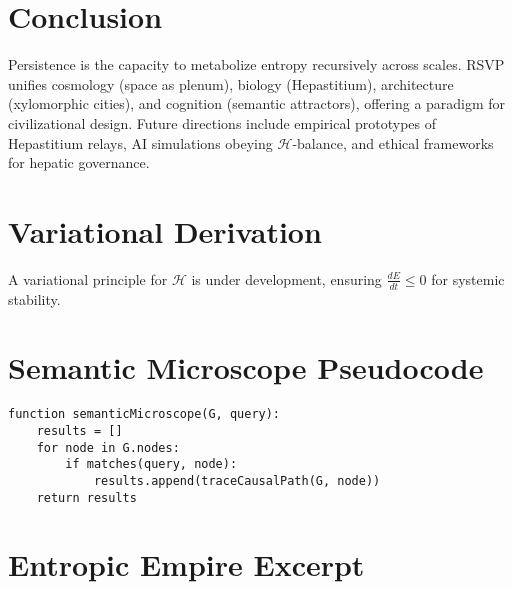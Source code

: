 \documentclass[12pt]{article}
\begin{document}
\section{Conclusion}
\label{sec:conclusion}

Persistence is the capacity to metabolize entropy recursively across scales. RSVP unifies cosmology (space as plenum), biology (Hepastitium), architecture (xylomorphic cities), and cognition (semantic attractors), offering a paradigm for civilizational design. Future directions include empirical prototypes of Hepastitium relays, AI simulations obeying \(\mathcal{H}\)-balance, and ethical frameworks for hepatic governance.

\appendix

\section{Variational Derivation}
\label{app:variational}
A variational principle for \(\mathcal{H}\) is under development, ensuring \(\frac{dE}{dt} \le 0\) for systemic stability.

\section{Semantic Microscope Pseudocode}
\label{app:pseudocode}
\begin{verbatim}
function semanticMicroscope(G, query):
    results = []
    for node in G.nodes:
        if matches(query, node):
            results.append(traceCausalPath(G, node))
    return results
\end{verbatim}

\section{Entropic Empire Excerpt}
\label{app:entropic_empire}
\end{document}
